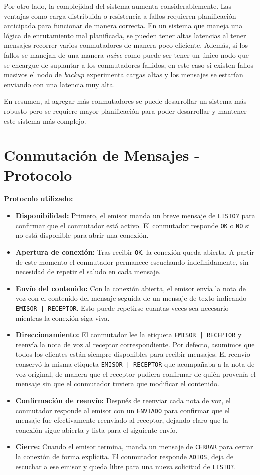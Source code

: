 \documentclass[11pt]{article}
\begin{document}
Por otro lado, la complejidad del sistema aumenta considerablemente. Las ventajas como carga distribuida o resistencia a fallos requieren planificación
anticipada para funcionar de manera correcta. En un sistema que maneja una lógica de enrutamiento mal planificada, se pueden tener altas latencias 
al tener mensajes recorrer varios conmutadores de manera poco eficiente. Además, si los fallos se manejan de una manera \textit{naive} como puede ser
tener un único nodo que se encargue de suplantar a los conmutadores fallidos, en este caso si existen fallos masivos el nodo de \textit{backup} experimenta
cargas altas y los mensajes se estarían enviando con una latencia muy alta.

En resumen, al agregar más conmutadores se puede desarrollar un sistema más robusto pero se requiere mayor planificación para poder desarrollar
y mantener este sistema más complejo.

\section*{Conmutación de Mensajes - Protocolo}
\textbf{Protocolo utilizado:}
\begin{itemize}
    \item \textbf{Disponibilidad:} Primero, el emisor manda un breve mensaje de \texttt{LISTO?} para confirmar que el conmutador está activo. El conmutador responde \texttt{OK} o \texttt{NO} si no está disponible para abrir una conexión.
    \item \textbf{Apertura de conexión:} Tras recibir \texttt{OK}, la conexión queda abierta. A partir de este momento el conmutador permanece escuchando indefinidamente, sin necesidad de repetir el saludo en cada mensaje.
    \item \textbf{Envío del contenido:} Con la conexión abierta, el emisor envía la nota de voz con el contenido del mensaje seguida de un mensaje de texto indicando \texttt{EMISOR | RECEPTOR}. Esto puede repetirse cuantas veces sea necesario mientras la conexión siga viva.
    \item \textbf{Direccionamiento:} El conmutador lee la etiqueta \texttt{EMISOR | RECEPTOR} y reenvía la nota de voz al receptor correspondiente. Por defecto, asumimos que todos los clientes están siempre disponibles para recibir mensajes. El reenvío conservó la misma etiqueta \texttt{EMISOR | RECEPTOR} que acompañaba a la nota de voz original, de manera que el receptor pudiera confirmar de quién provenía el mensaje sin que el conmutador tuviera que modificar el contenido.
    \item \textbf{Confirmación de reenvío:} Después de reenviar cada nota de voz, el conmutador responde al emisor con un \texttt{ENVIADO} para confirmar que el mensaje fue efectivamente reenviado al receptor, dejando claro que la conexión sigue abierta y lista para el siguiente envío.
    \item \textbf{Cierre:} Cuando el emisor termina, manda un mensaje de \texttt{CERRAR} para cerrar la conexión de forma explícita. El conmutador responde \texttt{ADIOS}, deja de escuchar a ese emisor y queda libre para una nueva solicitud de \texttt{LISTO?}.
\end{itemize}
\end{document}
